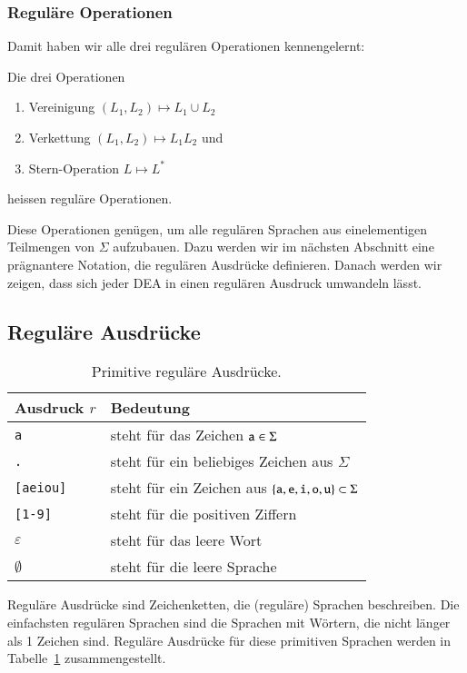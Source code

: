 \subsubsection{Reguläre Operationen}
Damit haben wir alle drei regulären Operationen kennengelernt:

\begin{definition}
Die drei Operationen
\begin{enumerate}
\item Vereinigung $(L_1,L_2)\mapsto L_1\cup L_2$
\item Verkettung $(L_1,L_2)\mapsto L_1L_2$ und
\item Stern-Operation $L\mapsto L^*$
\end{enumerate}
heissen reguläre Operationen.
\end{definition}

Diese Operationen genügen, um alle regulären Sprachen aus
einelementigen Teilmengen von $\Sigma$ aufzubauen.
Dazu werden wir im nächsten Abschnitt eine prägnantere Notation,
die regulären Ausdrücke definieren.
Danach werden wir zeigen,
dass sich jeder DEA in einen regulären Ausdruck umwandeln lässt.

\subsection{Reguläre Ausdrücke\label{regulaer:regulaere-ausdruecke}}
%
%
\begin{table}
\begin{center}
\begin{tabular}{|l|l|}
\hline
Ausdruck $r$&Bedeutung\\
\hline
{\tt a}&steht für das Zeichen ${\tt a}\in \Sigma$\\
{\tt .}&steht für ein beliebiges Zeichen aus $\Sigma$\\
{\tt [aeiou]}&steht für ein Zeichen aus $\{{\tt a},{\tt e},{\tt i},{\tt o},{\tt u}\}\subset \Sigma$\\
{\tt [1-9]}&steht für die positiven Ziffern\\
$\varepsilon$&steht für das leere Wort\\
$\emptyset$&steht für die leere Sprache\\
\hline
\end{tabular}
\end{center}
%
%
\caption{Primitive reguläre Ausdrücke.\label{regtab1}}
\end{table}
Reguläre Ausdrücke sind Zeichenketten, die (reguläre) Sprachen
beschreiben.
Die einfachsten regulären Sprachen sind die Sprachen mit Wörtern,
die nicht länger als 1 Zeichen sind.
Reguläre Ausdrücke für
diese primitiven Sprachen werden in Tabelle~\ref{regtab1} zusammengestellt.


